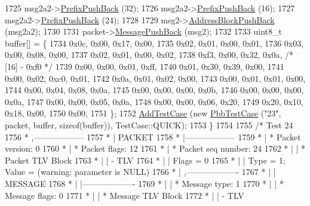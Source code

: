\begin{DoxyCode}
1725     msg2a2->\hyperlink{classns3_1_1PbbAddressBlock_a8e6f539ccffd043a2890396d882d0a42}{PrefixPushBack} (32);
1726     msg2a2->\hyperlink{classns3_1_1PbbAddressBlock_a8e6f539ccffd043a2890396d882d0a42}{PrefixPushBack} (16);
1727     msg2a2->\hyperlink{classns3_1_1PbbAddressBlock_a8e6f539ccffd043a2890396d882d0a42}{PrefixPushBack} (24);
1728 
1729     msg2->\hyperlink{classns3_1_1PbbMessage_a5f623bad2fb1adde7da885e1c92d5311}{AddressBlockPushBack} (msg2a2);
1730 
1731     packet->\hyperlink{classns3_1_1PbbPacket_a4a3170001ef758d9c9c4375b8f089826}{MessagePushBack} (msg2);
1732 
1733     uint8\_t buffer[] = \{
1734       0x0c, 0x00, 0x17, 0x00,
1735       0x02, 0x01, 0x00, 0x01,
1736       0x03, 0x00, 0x08, 0x00,
1737       0x02, 0x01, 0x00, 0x02,
1738       0xf3, 0x00, 0x32, 0x0a,   \textcolor{comment}{/* [16] - 0xf0 */}
1739       0x00, 0x00, 0x01, 0xff,
1740       0x01, 0x30, 0x39, 0x00,
1741       0x00, 0x02, 0xc0, 0x01,
1742       0x0a, 0x01, 0x02, 0x00,
1743       0x00, 0x01, 0x01, 0x00,
1744       0x00, 0x04, 0x08, 0x0a,
1745       0x00, 0x00, 0x00, 0x0b,
1746       0x00, 0x00, 0x00, 0x0a,
1747       0x00, 0x00, 0x05, 0x0a,
1748       0x00, 0x00, 0x06, 0x20,
1749       0x20, 0x10, 0x18, 0x00,
1750       0x00,
1751     \};
1752     \hyperlink{classns3_1_1TestCase_a3718088e3eefd5d6454569d2e0ddd835}{AddTestCase} (\textcolor{keyword}{new} \hyperlink{classPbbTestCase}{PbbTestCase} (\textcolor{stringliteral}{"23"}, packet, buffer, \textcolor{keyword}{sizeof}(buffer)), 
      TestCase::QUICK);
1753   \}
1754 
1755   \textcolor{comment}{/* Test 24}
1756 \textcolor{comment}{         * ,------------------}
1757 \textcolor{comment}{         * |  PACKET}
1758 \textcolor{comment}{         * |------------------}
1759 \textcolor{comment}{         * | * Packet version:    0}
1760 \textcolor{comment}{         * | * Packet flags:  12}
1761 \textcolor{comment}{         * | * Packet seq number: 24}
1762 \textcolor{comment}{         * |    | * Packet TLV Block}
1763 \textcolor{comment}{         * |    |     - TLV}
1764 \textcolor{comment}{         * |    |         Flags = 0}
1765 \textcolor{comment}{         * |    |         Type = 1; Value = (warning: parameter is NULL)}
1766 \textcolor{comment}{         * |    ,-------------------}
1767 \textcolor{comment}{         * |    |  MESSAGE}
1768 \textcolor{comment}{         * |    |-------------------}
1769 \textcolor{comment}{         * |    | * Message type:       1}
1770 \textcolor{comment}{         * |    | * Message flags:  0}
1771 \textcolor{comment}{         * |    | * Message TLV Block}
1772 \textcolor{comment}{         * |    |     - TLV}

\end{DoxyCode}

